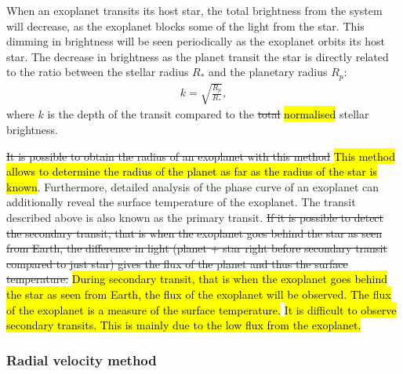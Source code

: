 When an exoplanet transits its host star, the total brightness from the system will decrease, as the
exoplanet blocks some of the light from the star. This dimming in brightness will be seen
periodically as the exoplanet orbits its host star. The decrease in brightness as the planet transit
the star is directly related to the ratio between the stellar radius $R_\ast$ and the planetary
radius $R_p$:
\begin{align}
  k = \sqrt{\frac{R_p}{R_\ast}},  \label{eq:transit}
\end{align}
where $k$ is the depth of the transit compared to the \st{total} \hl{normalised} stellar brightness.

\st{It is possible to obtain the radius of an exoplanet with this method} \hl{This method allows to
determine the radius of the planet as far as the radius of the star is known}. Furthermore, detailed
analysis of the phase curve of an exoplanet can additionally reveal the surface temperature of the
exoplanet. The transit described above is also known as the primary transit. \st{If it is possible
to detect the secondary transit, that is when the exoplanet goes behind the star as seen from Earth,
the difference in light (planet + star right before secondary transit compared to just star) gives
the flux of the planet and thus the surface temperature.} \hl{During secondary transit, that is when
the exoplanet goes behind the star as seen from Earth, the flux of the exoplanet will be observed.
The flux of the exoplanet is a measure of the surface temperature.} \hl{It is difficult to observe
secondary transits. This is mainly due to the low flux from the exoplanet.}



\subsubsection{Radial velocity method}
\label{sec:rvmethod}

